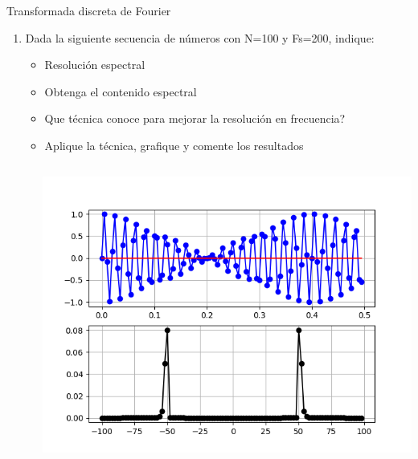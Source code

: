  \begin{frame}{Transformada discreta de Fourier}
    \begin{enumerate}
       \item{Dada la siguiente secuencia de números con N=100 y Fs=200, indique:}
    \begin{itemize}
       \item{Resolución espectral}
       \item{Obtenga el contenido espectral}
       \item{Que técnica conoce para mejorar la resolución en frecuencia?}
       \item{Aplique la técnica, grafique y comente los resultados}
    \end{itemize}

   \begin{columns}[c]
      \hspace{2pt}
      \begin{column}{.6\textwidth}
         
      \end{column}
      \hspace{2pt}
      \vrule
      \begin{column}{.4\textwidth}
         \centering\includegraphics[width=1.0\textwidth]{tp2/zero_padding}
      \end{column}
      \hspace{2pt}
   \end{columns}
    \end{enumerate}
    \vfill
 \end{frame}
